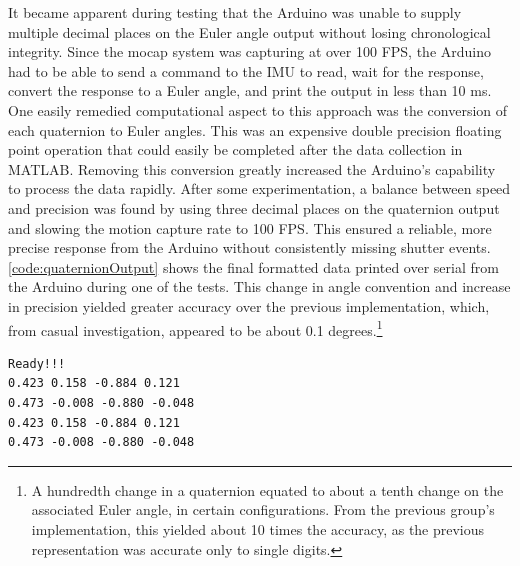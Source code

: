 \documentclass[letterpaper, 10 pt, conference]{ieeeconf}  %
\begin{document}
It became apparent during testing that the Arduino was unable to supply multiple decimal places on the Euler angle output without losing chronological integrity. Since the mocap system was capturing at over 100 FPS, the Arduino had to be able to send a command to the IMU to read, wait for the response, convert the response to a Euler angle, and print the output in less than 10 ms. One easily remedied computational aspect to this approach was the conversion of each quaternion to Euler angles. This was an expensive double precision floating point operation that could easily be completed after the data collection in MATLAB. Removing this conversion greatly increased the Arduino's capability to process the data rapidly. After some experimentation, a balance between speed and precision was found by using three decimal places on the quaternion output and slowing the motion capture rate to 100 FPS. This ensured a reliable, more precise response from the Arduino without consistently missing shutter events. \autoref{code:quaternionOutput} shows the final formatted data printed over serial from the Arduino during one of the tests. This change in angle convention and increase in precision yielded greater accuracy over the previous implementation, which, from casual investigation, appeared to be about 0.1 degrees.\footnote{A hundredth change in a quaternion equated to about a tenth change on the associated Euler angle, in certain configurations. From the previous group's implementation, this yielded about 10 times the accuracy, as the previous representation was accurate only to single digits.}

\begin{lstlisting}[frame=single, basicstyle=\small]
Ready!!!
0.423 0.158 -0.884 0.121
0.473 -0.008 -0.880 -0.048
0.423 0.158 -0.884 0.121
0.473 -0.008 -0.880 -0.048
\end{lstlisting}
\end{document}
